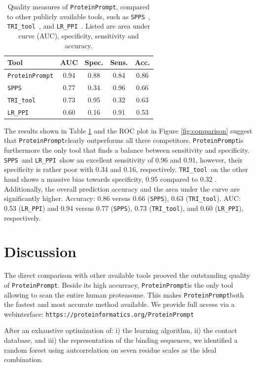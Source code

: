 \documentclass[preprint,3p,times,twocolumn]{elsarticle}
\newcommand{\url}[1]{\texttt{https://\small #1}}
\newcommand{\spps}{\texttt{SPPS}}
\newcommand{\tri}{\texttt{TRI\_tool}}
\newcommand{\lr}{\texttt{LR\_PPI}}
\newcommand{\toolblank}{\texttt{ProteinPrompt}}
\newcommand{\tool}{\toolblank\hspace{2pt}}
\newcommand{\website}{\url{proteinformatics.org/\tool}}
\begin{document}
\begin{table}
\begin{tabular}{|l |c | c | c | c |}
  \hline
  Tool  & AUC & Spec. & Sens. & Acc. \\
  \hline
  \tool  & 0.94 & 0.88 & 0.84 &  0.86 \\
  \hline
  \spps\  & 0.77 & 0.34 & 0.96 & 0.66 \\
  \hline
  \tri\  & 0.73 & 0.95 & 0.32 & 0.63 \\
  \hline
  \lr\  & 0.60 & 0.16 & 0.91 & 0.53  \\
  \hline
\end{tabular}
\caption{ Quality measures of \tool, compared to other publicly
  available tools, such as \spps\ \cite{Liu:2012}, \tri\
  \cite{Perovic:2017}, and \lr\ \cite{Pan:2010}.
  Listed are area under curve (AUC), specificity, sensitivity and accuracy.}

\label{table:comparison}
\end{table}

The results shown in Table \ref{table:comparison} and the ROC plot in
Figure \ref{fig:comparison} suggest that \tool clearly outperforms all
three competitors. \tool is furthermore the only tool that finds a
balance between sensitivity and specificity. \spps\ and \lr\ show an
excellent sensitivity of 0.96 and 0.91, however, their
specificity is rather poor with 0.34 and 0.16, respectively. \tri\ on
the other hand shows a massive bias towards specificity, 0.95 compared
to 0.32 .
Additionally, the overall prediction accuracy and the area under the curve are significantly higher.
Accuracy: 0.86 versus 0.66 (\spps), 0.63 (\tri).
AUC: 0.53 (\lr) and 0.94 versus 0.77 (\spps), 0.73 (\tri), and 0.60 (\lr), respectively.


\section{Discussion}

The direct comparison with other available tools prooved the
outstanding quality of \tool. Beside its high accurracy, \tool is the
only tool allowing to scan the entire human proteasome. This makes
\tool both the fastest and most accurate method available. We provide
full access via a webinterface: \website

After an exhaustive optimization of: i) the learning algorithm, ii)
the contact database, and iii) the representation of the binding
sequences, we identified a random forest using autcorrelation on seven
residue scales as the ideal combination.
\end{document}
